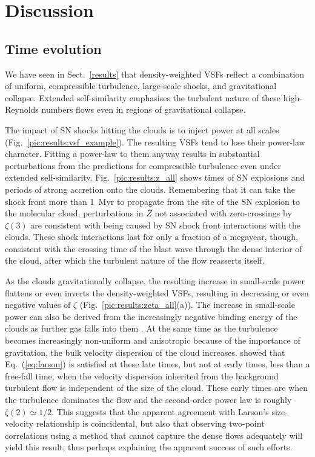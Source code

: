 \section{Discussion}\label{discussion}

\subsection{Time evolution}\label{discussion:normal}

We have seen in Sect.~\ref{results} that density-weighted VSFs reflect a combination of uniform, compressible turbulence, large-scale shocks, and gravitational collapse.  Extended self-similarity emphasises the turbulent nature of these high-Reynolds numbers flows even in regions of gravitational collapse. 

The impact of SN shocks hitting the clouds is to inject power at all scales (Fig.~\ref{pic:results:vsf_example}). 
The resulting VSFs tend to lose their power-law character. Fitting a power-law to them anyway results in substantial perturbations from the predictions for compressible turbulence even under extended self-similarity.
Fig.~\ref{pic:results:z_all} shows times of SN explosions and periods of strong accretion onto the clouds. 
Remembering that it can take the shock front more than 1~Myr to propagate from the site of the SN explosion to the molecular cloud, perturbations in $Z$ not associated with zero-crossings by $\zeta(3)$ are consistent with being caused by SN shock front interactions with the clouds.  
These shock interactions last for only a fraction of a megayear, though, consistent with the crossing time of the blast wave through the dense interior of the cloud, after which the turbulent nature of the flow reasserts itself.

As the clouds gravitationally collapse, the resulting increase in small-scale power flattens or even inverts the density-weighted VSFs, resulting in decreasing or even negative values of $\zeta$ (Fig.~\ref{pic:results:zeta_all}(a)). The increase in small-scale power can also be derived from the increasingly negative binding energy of the clouds as further gas falls into them . 
At the same time as the turbulence becomes increasingly non-uniform and anisotropic because of the importance of gravitation, the bulk velocity dispersion of the cloud increases.
 showed that Eq.~(\ref{eq:larson}) is satisfied at these late times, but not at early times, less than a free-fall time, when the velocity dispersion inherited from the background turbulent flow is independent of the size of the cloud. 
These early times are when the turbulence dominates the flow and the second-order power law is roughly $\zeta(2) \simeq 1/2$.
This suggests that the apparent agreement with Larson's size-velocity relationship is coincidental, but also that observing two-point correlations using a method that cannot capture the dense flows adequately will yield this result, thus perhaps explaining the apparent success of such efforts.

